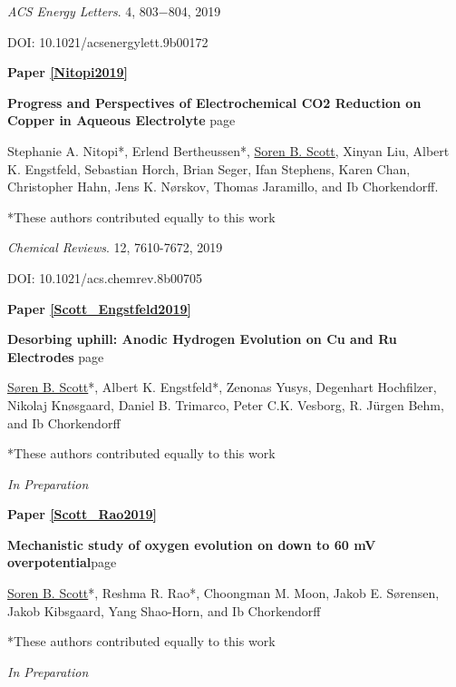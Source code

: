 \textit{ACS Energy Letters}. 4, 803−804, 2019

DOI: 10.1021/acsenergylett.9b00172


\vspace{5mm}
\noindent\textbf{Paper \ref{Nitopi2019}} 

\textbf{Progress and Perspectives of Electrochemical CO2 Reduction on Copper in Aqueous Electrolyte} \hfill page~\pageref{Nitopi2019}

Stephanie A. Nitopi*, Erlend Bertheussen*, \underline{Soren B. Scott}, Xinyan Liu, Albert K. Engstfeld, Sebastian Horch, Brian Seger, Ifan Stephens, Karen Chan, Christopher Hahn, Jens K. Nørskov, Thomas Jaramillo, and Ib Chorkendorff.

*These authors contributed equally to this work

\textit{Chemical Reviews}. 12, 7610-7672, 2019

DOI: 10.1021/acs.chemrev.8b00705



\vspace{5mm}

\noindent\textbf{Paper \ref{Scott_Engstfeld2019}} 
	
\textbf{Desorbing uphill: Anodic Hydrogen Evolution on Cu and Ru Electrodes} \hfill page~\pageref{Scott_Engstfeld2019}

\underline{Søren B. Scott}*, Albert K. Engstfeld*, Zenonas Yusys, Degenhart Hochfilzer, Nikolaj Knøsgaard, Daniel B. Trimarco, Peter C.K. Vesborg, R. Jürgen Behm, and Ib Chorkendorff

*These authors contributed equally to this work

\textit{In Preparation}


\vspace{5mm}
\noindent\textbf{Paper \ref{Scott_Rao2019}} 

\textbf{Mechanistic study of oxygen evolution on  down to 60 mV overpotential}\hfill page~\pageref{Scott_Rao2019}

\underline{Soren B. Scott}*, Reshma R. Rao*, Choongman M. Moon, Jakob E. S\o rensen, Jakob Kibsgaard, Yang Shao-Horn, and Ib Chorkendorff

*These authors contributed equally to this work

\textit{In Preparation}